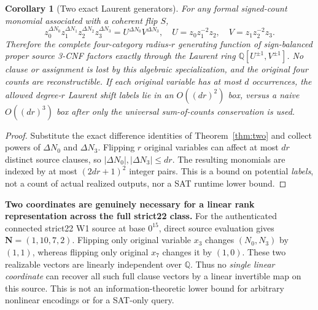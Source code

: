 \documentclass[11pt]{article}
\newtheorem{corollary}{Corollary}
\newcommand{\vN}{\boldsymbol N}
\newcommand{\Q}{\mathbb Q}
\begin{document}
\begin{corollary}[Two exact Laurent generators]\label{cor:laurent}
For any formal signed-count monomial associated with a coherent flip $S$,
\[z_0^{\Delta N_0}z_1^{\Delta N_1}z_2^{\Delta N_2}z_3^{\Delta N_3} = U^{\Delta N_0}V^{\Delta N_3},\quad U=z_0z_1^{-2}z_2,\quad V=z_1z_2^{-2}z_3.\]
Therefore the complete four-category radius-$r$ generating function of sign-balanced proper source 3-CNF factors exactly through the Laurent ring $\Q[U^{\pm1},V^{\pm1}]$. No clause or assignment is lost by this algebraic specialization, and the original four counts are reconstructible. If each original variable has at most $d$ occurrences, the allowed degree-$r$ Laurent shift labels lie in an $O((dr)^2)$ box, versus a naive $O((dr)^3)$ box after only the universal sum-of-counts conservation is used.
\end{corollary}
\begin{proof}
Substitute the exact difference identities of Theorem~\ref{thm:two} and collect powers of $\Delta N_0$ and $\Delta N_3$. Flipping $r$ original variables can affect at most $dr$ distinct source clauses, so $|\Delta N_0|,|\Delta N_3|\le dr$. The resulting monomials are indexed by at most $(2dr+1)^2$ integer pairs. This is a bound on potential \emph{labels}, not a count of actual realized outputs, nor a SAT runtime lower bound.\end{proof}

\noindent\textbf{Two coordinates are genuinely necessary for a linear rank representation across the full strict22 class.} For the authenticated connected strict22 W1 source at base $0^{15}$, direct source evaluation gives $\vN=(1,10,7,2)$. Flipping only original variable $x_3$ changes $(N_0,N_3)$ by $(1,1)$, whereas flipping only original $x_7$ changes it by $(1,0)$. These two realizable vectors are linearly independent over $\Q$. Thus no \emph{single linear coordinate} can recover all such full clause vectors by a linear invertible map on this source. This is not an information-theoretic lower bound for arbitrary nonlinear encodings or for a SAT-only query.
\end{document}
